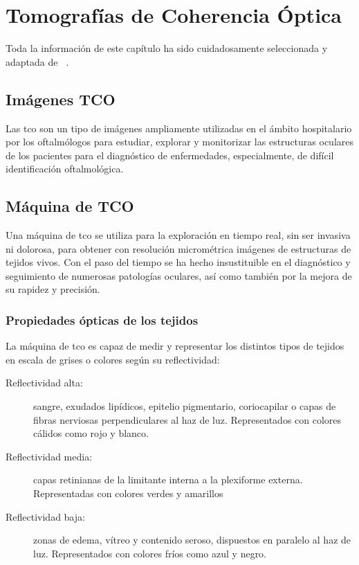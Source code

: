 \chapter{Tomografías de Coherencia Óptica}
Toda la información de este capítulo ha sido cuidadosamente
seleccionada y adaptada de \emph{~\citep*[Avances en la exploración de la
  retina: OCT:\@ Qué es y para qué sirve]{oct-bib}}.

\section{Imágenes TCO}
Las \gls{tco} son un tipo de imágenes ampliamente utilizadas en el
ámbito hospitalario por los oftalmólogos para estudiar, explorar y
monitorizar las estructuras oculares de los pacientes para el
diagnóstico de enfermedades, especialmente, de difícil identificación
oftalmológica.

\section{Máquina de TCO}
Una máquina de \gls{tco} se utiliza para la exploración en tiempo
real, sin ser invasiva ni dolorosa, para obtener con resolución
micrométrica imágenes de estructuras de tejidos vivos. Con el paso del
tiempo se ha hecho insustituible en el diagnóstico y seguimiento de
numerosas patologías oculares, así como también por la mejora de su
rapidez y precisión.

\subsection{Propiedades ópticas de los tejidos}
La máquina de \gls{tco} es capaz de medir y representar los distintos
tipos de tejidos en escala de grises o colores según su reflectividad:
\begin{description}
\item[Reflectividad alta:] sangre, exudados lipídicos, epitelio
  pigmentario, coriocapilar o capas de fibras nerviosas
  perpendiculares al haz de luz. Representados con colores cálidos
  como rojo y blanco.
\item[Reflectividad media:] capas retinianas de la limitante interna a
  la plexiforme externa. Representadas con colores verdes y amarillos
\item[Reflectividad baja:] zonas de edema, vítreo y contenido seroso,
  dispuestos en paralelo al haz de luz. Representados con colores
  fríos como azul y negro.
\end{description}

